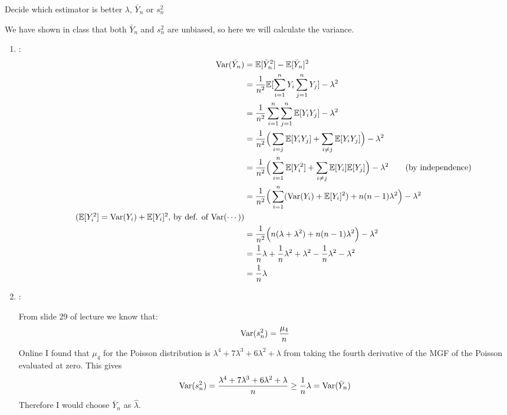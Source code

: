 
\item Decide which estimator is better $\lambda$, $\bar{Y}_n$ or $s^2_n$

    We have shown in class that both $\bar{Y}_n$ and $s^2_n$ are unbiased, so here we will calculate the variance.
    \begin{enumerate}

        \item {}:
            \begin{align*}
                \var{\bar{Y}_n} &= \expec{\bar{Y}_n^2}- \expec{\bar{Y}_n}^2\\
                                &= \frac{1}{n^2}\expec{\sum_{i=1}^n Y_i\sum_{j=1}^n Y_j}- \lambda^2\\
                                &= \frac{1}{n^2}\sum_{i=1}^n\sum_{j=1}^n\expec{Y_i Y_j}- \lambda^2\\
                                &= \frac{1}{n^2}\Big(\sum_{i=j}\expec{Y_i Y_j}+ \sum_{i\neq j}\expec{Y_i Y_j}\Big)- \lambda^2\\
                                &= \frac{1}{n^2}\Big(\sum_{i=1}^n\expec{Y_i^2}+ \sum_{i\neq j}\expec{Y_i}\expec{ Y_j}\Big)- \lambda^2\tag*{(by independence)}\\
                                &= \frac{1}{n^2}\Big(\sum_{i=1}^n(\var{Y_i}+\expec{Y_i}^2)+ n(n-1)\lambda^2\Big)- \lambda^2\\
                                \tag*{($\expec{Y_i^2} =\var{Y_i} + \expec{Y_i}^2$, by def. of Var($\cdots$))}\\
                                &= \frac{1}{n^2}\Big(n(\lambda+\lambda^2)+ n(n-1)\lambda^2\Big)- \lambda^2\\
                                &= \frac{1}{n}\lambda+\frac{1}{n}\lambda^2+\lambda^2 - \frac{1}{n}\lambda^2- \lambda^2\\
                                &= \frac{1}{n}\lambda
            \end{align*}
        \item {}:

            From slide 29 of lecture we know that: 
                \begin{equation*}
                    \text{Var}(s^2_n) = \frac{\mu_4}{n}
                \end{equation*}
            Online I found that $\mu_4$ for the Poisson distribution is $\lambda^4 + 7\lambda^3 + 6\lambda^2 + \lambda$ from taking the fourth derivative of the MGF of the Poisson evaluated at zero. 
            This gives
                \begin{equation*}
                    \text{Var}(s^2_n) = \frac{\lambda^4 + 7\lambda^3 + 6\lambda^2 + \lambda}{n} \geq \frac{1}{n}\lambda = \text{Var}(\bar{Y}_n)
                \end{equation*}
                Therefore I would choose $\bar{Y}_n$ as $\hat{\lambda}$.

    \end{enumerate}
